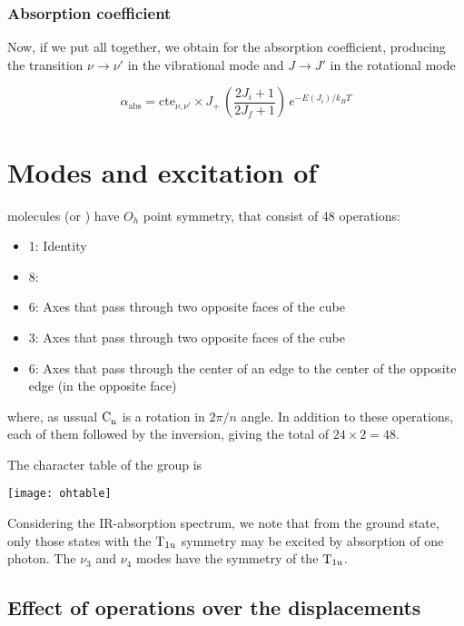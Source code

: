 \subsubsection{Absorption coefficient}
\label{S:absorpt-coeff}

Now, if we put all together, we obtain for the absorption coefficient, producing the transition $\nu \to \nu'$ in the vibrational mode and $J \to J'$ in the rotational mode

\begin{equation}
  \label{Q:absorption-coeff-J}
  \alpha_{\text{abs}} = \text{cte}_{\nu,\nu'} \times J_{+}\, \left( \frac{2 J_{i}+1}{2 J_{f}+1}\right)\, e^{-E(J_{i})/k_{B}T} 
\end{equation}

\newpage
\section{Modes and excitation of }
\label{S:modes-excit-qf6}

 molecules (or ) have $O_{h}$ point symmetry, that consist of 48 operations:
\begin{itemize}
\item 1: Identity
\item 8:
\item 6: Axes that pass through two opposite faces of the cube 
\item 3: Axes that pass through two opposite faces of the cube 
\item 6: Axes that pass through the center of an edge to the center of the opposite edge (in the opposite face)
\end{itemize}
where, as ussual $\ce{C_{n}}$ is a rotation in $2\pi/n$ angle. In addition to these operations, each of them followed by the inversion, giving the total of $24 \times 2 = 48$.

The character table of the group is
\begin{center}
\texttt{[image: ohtable]}
\end{center}

Considering the IR-absorption spectrum, we note that from the ground state, only those states with the $\text{T}_{\text{1u}}$ symmetry may be excited by absorption of one photon.
The $\nu_{3}$ and $\nu_{4}$ modes have the symmetry of the $\text{T}_{\text{1u}}$.

\subsection{Effect of operations over the displacements}
\label{S:operat-displac}

